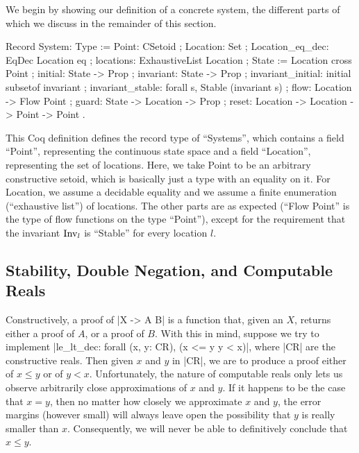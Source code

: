 \documentclass[runningheads]{llncs}
\newcommand{\weg}[1]{}
\newcommand{\IR}{{\mathbf R}}
\newcommand{\Inv}{{\rm Inv}}
\newcommand{\leltdec}{{\tt leltdec}}
\begin{document}
We begin by showing our definition of a concrete system, the different
parts of which we discuss in the remainder of this section.
\begin{code}
Record System: Type :=
  { Point: CSetoid
  ; Location: Set
  ; Location_eq_dec: EqDec Location eq
  ; locations: ExhaustiveList Location
  ; State :=  Location cross Point
  ; initial: State -> Prop
  ; invariant: State -> Prop
  ; invariant_initial: initial subsetof invariant
  ; invariant_stable: forall s, Stable (invariant s)
  ; flow: Location -> Flow Point
  ; guard: State -> Location -> Prop
  ; reset: Location -> Location -> Point -> Point  }.
\end{code}
This Coq definition defines the record type of ``Systems'', which
contains a field ``Point'', representing the continuous state space
and a field ``Location'', representing the set of locations. Here, we
take Point to be an arbitrary constructive setoid, which is basically
just a type with an equality on it. For Location, we assume a
decidable equality and we assume a finite enumeration (``exhaustive
list'') of locations. The other parts are as expected (``Flow Point''
is the type of flow functions on the type ``Point''), except for the
requirement that the invariant $\Inv_l$ is ``Stable'' for every
location $l$.

\subsection{Stability, Double Negation, and Computable Reals}
\label{dn}

\weg{ %
A property |P| is {\em stable\/} if $\neg \neg P$ implies |P|.
Classically, this is trivially true, but constructively
not.
}

Constructively, a proof of |X -> A \/ B| is a function that, given an $X$,
returns either a proof of $A$, or a proof of $B$. With this in mind,
suppose we try to implement |le_lt_dec: forall (x, y: CR), (x <= y \/ y < x)|, where |CR| are the constructive reals. Then given $x$ and $y$ in
|CR|, we are to produce a proof either of $x \leq y$ or of $y <
x$. Unfortunately, the nature of computable reals only lets us observe
arbitrarily close approximations of $x$ and $y$. If it happens to be the case that $x =
y$, then no matter how closely we approximate $x$ and $y$, the error
margins (however small) will always leave open the possibility that
$y$ is really smaller than $x$. Consequently, we will never be able to
definitively conclude that $x \leq y$.
\end{document}
